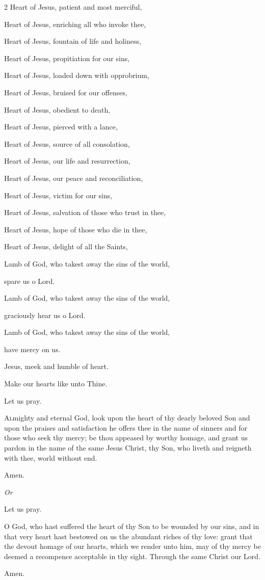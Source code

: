 \begin{enpars}
\begin{multicols}{2}
Heart of Jesus, patient and most merciful,

Heart of Jesus, enriching all who invoke thee,

Heart of Jesus, fountain of life and holiness,

Heart of Jesus, propitiation for our sins,

Heart of Jesus, loaded down with opprobrium,

Heart of Jesus, bruised for our offenses,

Heart of Jesus, obedient to death,

Heart of Jesus, pierced with a lance,

Heart of Jesus, source of all consolation,

Heart of Jesus, our life and resurrection,

Heart of Jesus, our peace and reconciliation,

Heart of Jesus, victim for our sins,

Heart of Jesus, salvation of those who trust in thee,

Heart of Jesus, hope of those who die in thee,

Heart of Jesus, delight of all the Saints,

Lamb of God, who takest away
the sins of the world,

spare us o Lord.

Lamb of God, who takest away
the sins of the world,

graciously hear us o Lord.

Lamb of God, who takest away
the sins of the world,

have mercy on us.
\end{multicols}

\vv Jesus, meek and humble of heart.

\rr Make our hearts like unto Thine.

Let us pray.

\lettrine{A}{l}mighty and eternal God, look upon the heart of thy dearly beloved Son and upon the praises and satisfaction he offers thee in the name of sinners and for those who seek thy mercy; be thou appeased by worthy homage, and grant us pardon in the name of the same Jesus Christ, thy Son, who liveth and reigneth with thee, world without end. 

\rr Amen.

\textit{Or}

Let us pray.

\lettrine{O}{} God, who hast suffered the heart of thy Son to be wounded by our sins, and in that very heart hast bestowed on us the abundant riches of thy love: grant that the devout homage of our hearts, which we render unto him, may of thy mercy be deemed a recompence acceptable in thy sight. Through the same Christ our Lord.

\rr Amen.

\end{enpars}